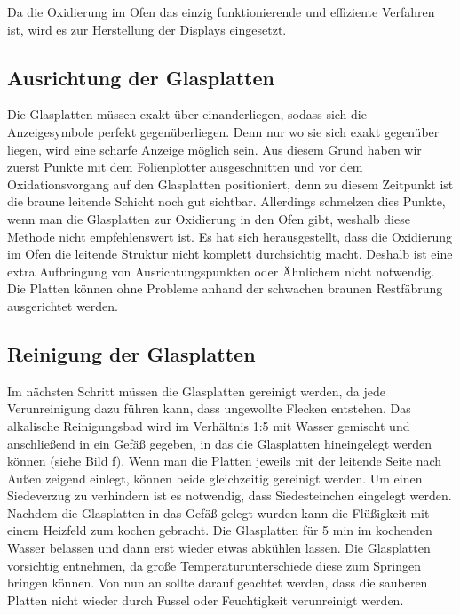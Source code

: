Da die Oxidierung im Ofen das einzig funktionierende und effiziente Verfahren ist, wird es zur Herstellung der Displays eingesetzt.

\subsection{Ausrichtung der Glasplatten}

Die Glasplatten müssen exakt über einanderliegen, sodass sich die Anzeigesymbole perfekt gegenüberliegen. Denn nur wo sie sich exakt gegenüber liegen, wird eine scharfe Anzeige möglich sein.
Aus diesem Grund haben wir zuerst Punkte mit dem Folienplotter ausgeschnitten und vor dem Oxidationsvorgang auf den Glasplatten positioniert, denn zu diesem Zeitpunkt ist die braune leitende Schicht noch gut sichtbar. Allerdings schmelzen dies Punkte, wenn man die Glasplatten zur Oxidierung in den Ofen gibt, weshalb diese Methode nicht empfehlenswert ist.
Es hat sich herausgestellt, dass die Oxidierung im Ofen die leitende Struktur nicht komplett durchsichtig macht. Deshalb ist eine extra Aufbringung von Ausrichtungspunkten oder Ähnlichem nicht notwendig.\\
Die Platten können ohne Probleme anhand der schwachen braunen Restfäbrung ausgerichtet werden.

\subsection{Reinigung der Glasplatten}


Im nächsten Schritt müssen die Glasplatten gereinigt werden, da jede Verunreinigung dazu führen kann, dass ungewollte Flecken entstehen.
Das alkalische Reinigungsbad wird im Verhältnis 1:5 mit Wasser gemischt und anschließend in ein Gefäß gegeben, in das die Glasplatten hineingelegt werden können (siehe Bild f). Wenn man die Platten jeweils mit der leitende Seite nach Außen zeigend einlegt, können beide gleichzeitig gereinigt werden. Um einen Siedeverzug zu verhindern ist es notwendig, dass Siedesteinchen eingelegt werden. Nachdem die Glasplatten in das Gefäß gelegt wurden kann die Flüßigkeit mit einem Heizfeld zum kochen gebracht. Die Glasplatten für 5 min im kochenden Wasser belassen und dann erst wieder etwas abkühlen lassen. Die Glasplatten vorsichtig entnehmen, da große Temperaturunterschiede diese zum Springen bringen können.
Von nun an sollte darauf geachtet werden, dass die sauberen Platten nicht wieder durch Fussel oder Feuchtigkeit verunreinigt werden.

